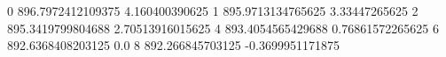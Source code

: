 0 896.7972412109375 4.160400390625
1 895.9713134765625 3.33447265625
2 895.3419799804688 2.70513916015625
4 893.4054565429688 0.76861572265625
6 892.6368408203125 0.0
8 892.266845703125 -0.3699951171875
